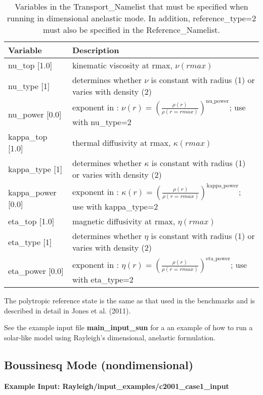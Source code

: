 \begin{table}
\centering
\begin{tabular}{| l | l |}
\hline
Variable & Description \\
\hline
nu\_top [1.0]   & kinematic viscosity at rmax, $\nu(rmax)$ \\
nu\_type [1]    & determines whether $\nu$ is constant with radius (1) or varies with density (2) \\
nu\_power [0.0] & exponent in : $\nu(r) = \left( \frac{\rho(r)}{\rho(r=rmax)} \right)^{\mathrm{nu\_power}}$; use with nu\_type=2 \\
\hline
kappa\_top [1.0]   & thermal diffusivity at rmax, $\kappa(rmax)$ \\
kappa\_type [1]    & determines whether $\kappa$ is constant with radius (1) or varies with density (2) \\
kappa\_power [0.0] & exponent in : $\kappa(r) = \left( \frac{\rho(r)}{\rho(r=rmax)} \right)^{\mathrm{kappa\_power}}$; use with kappa\_type=2 \\
\hline
eta\_top [1.0]   & magnetic diffusivity at rmax, $\eta(rmax)$ \\
eta\_type [1]    & determines whether $\eta$ is constant with radius (1) or varies with density (2) \\
eta\_power [0.0] & exponent in : $\eta(r) = \left( \frac{\rho(r)}{\rho(r=rmax)} \right)^{\mathrm{eta\_power}}$; use with eta\_type=2 \\
\hline
\end{tabular}
\caption{\label{table:anelastic_trans} Variables in the Transport\_Namelist that must be specified when running in dimensional anelastic mode. In addition, reference\_type=2 must also be specified in the Reference\_Namelist.}
\end{table}

The polytropic reference state is the same as that used in the benchmarks and is described in detail in Jones et al. (2011).

See the example input file \textbf{main\_input\_sun} for a an example of how to run a solar-like model using Rayleigh's dimensional, anelastic formulation.

\clearpage
\subsection{Boussinesq Mode (nondimensional)}

\textbf{Example Input:  Rayleigh/input\_examples/c2001\_case1\_input}

